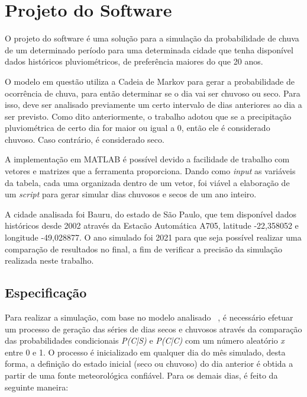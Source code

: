 \pagestyle{simple}
\chapter{Projeto do Software}
\label{c.projeto}

O projeto do software é uma solução para a simulação da probabilidade de chuva de um determinado período para uma determinada cidade que tenha disponível dados históricos pluviométricos, de preferência maiores do que 20 anos.

O modelo em questão utiliza a Cadeia de Markov para gerar a probabilidade de ocorrência de chuva, para então determinar se o dia vai ser chuvoso ou seco. Para isso, deve ser analisado previamente um certo intervalo de dias anteriores ao dia a ser previsto. Como dito anteriormente, o trabalho adotou que se a precipitação pluviométrica de certo dia for maior ou igual a 0, então ele é considerado chuvoso. Caso contrário, é considerado seco.

A implementação em MATLAB é possível devido a facilidade de trabalho com vetores e matrizes que a ferramenta proporciona. Dando como \emph{input} as variáveis da tabela, cada uma organizada dentro de um vetor, foi viável a elaboração de um \emph{script} para gerar simular dias chuvosos e secos de um ano inteiro.

A cidade analisada foi Bauru, do estado de São Paulo, que tem disponível dados históricos desde 2002 através da Estacão Automática A705, latitude -22,358052 e longitude -49,028877. O ano simulado foi 2021 para que seja possível realizar uma comparação de resultados no final, a fim de verificar a precisão da simulação realizada neste trabalho.
\section{Especificação}
\label{s.especificacao}

Para realizar a simulação, com base no modelo analisado ~\cite{artigo_modelo}, é necessário efetuar um processo de geração das séries de dias secos e chuvosos através da comparação das probabilidades condicionais \emph{P(C|S)} e \emph{P(C|C)} com um número aleatório \emph{x} entre 0 e 1. O processo é inicializado em qualquer dia do mês simulado, desta forma, a definição do estado inicial (seco ou chuvoso) do dia anterior é obtida a partir de uma fonte meteorológica confiável. Para os demais dias, é feito da seguinte maneira:

